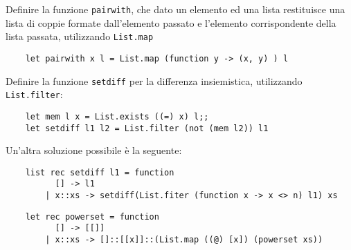 \documentclass{article}
\numberwithin{equation}{subsection}
\begin{document}
Definire la funzione \verb|pairwith|, che dato un elemento ed una lista restituisce una lista di coppie formate dall'elemento passato e l'elemento corrispondente della lista passata, utilizzando \verb|List.map|
\begin{verbatim}
    let pairwith x l = List.map (function y -> (x, y) ) l
\end{verbatim}

Definire la funzione \verb|setdiff| per la differenza insiemistica, utilizzando \verb|List.filter|:

\begin{verbatim}
    let mem l x = List.exists ((=) x) l;;
    let setdiff l1 l2 = List.filter (not (mem l2)) l1
\end{verbatim}

Un'altra soluzione possibile è la seguente:
\begin{verbatim}
    list rec setdiff l1 = function
          [] -> l1
        | x::xs -> setdiff(List.fiter (function x -> x <> n) l1) xs    
\end{verbatim}

\begin{verbatim}
    let rec powerset = function
          [] -> [[]]
        | x::xs -> []::[[x]]::(List.map ((@) [x]) (powerset xs))
\end{verbatim}
\end{document}
